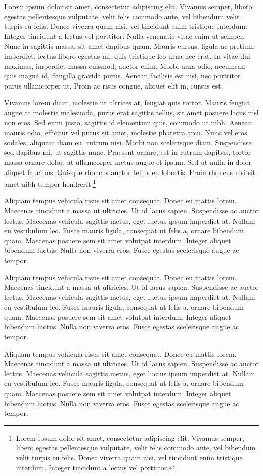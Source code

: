 
Lorem ipsum dolor sit amet, consectetur adipiscing elit. Vivamus semper, libero egestas pellentesque vulputate, velit felis commodo ante, vel bibendum velit turpis eu felis. Donec viverra quam nisi, vel tincidunt enim tristique interdum. Integer tincidunt a lectus vel porttitor. Nulla venenatis vitae enim ut semper. Nunc in sagittis massa, sit amet dapibus quam. Mauris cursus, ligula ac pretium imperdiet, lectus libero egestas mi, quis tristique leo urna nec erat. In vitae dui maximus, imperdiet massa euismod, auctor enim. Morbi urna odio, accumsan quis magna id, fringilla gravida purus. Aenean facilisis est nisi, nec porttitor purus ullamcorper ut. Proin ac risus congue, aliquet elit in, cursus est.

Vivamus lorem diam, molestie ut ultrices at, feugiat quis tortor. Mauris feugiat, augue at molestie malesuada, purus erat sagittis tellus, sit amet posuere lacus nisl non eros. Sed enim justo, sagittis id elementum quis, commodo ut nibh. Aenean mauris odio, efficitur vel purus sit amet, molestie pharetra arcu. Nunc vel eros sodales, aliquam diam eu, rutrum nisi. Morbi non scelerisque diam. Suspendisse sed dapibus mi, ut sagittis nunc. Praesent ornare, est in rutrum dapibus, tortor massa ornare dolor, at ullamcorper metus augue et ipsum. Sed ut nulla in dolor aliquet faucibus. Quisque rhoncus auctor tellus eu lobortis. Proin rhoncus nisi sit amet nibh tempor hendrerit.\footnote{Lorem ipsum dolor sit amet, consectetur adipiscing elit. Vivamus semper, libero egestas pellentesque vulputate, velit felis commodo ante, vel bibendum velit turpis eu felis. Donec viverra quam nisi, vel tincidunt enim tristique interdum. Integer tincidunt a lectus vel porttitor.}

Aliquam tempus vehicula risus sit amet consequat. Donec eu mattis lorem. Maecenas tincidunt a massa ut ultricies. Ut id lacus sapien. Suspendisse ac auctor lectus. Maecenas vehicula sagittis metus, eget luctus ipsum imperdiet at. Nullam eu vestibulum leo. Fusce mauris ligula, consequat ut felis a, ornare bibendum quam. Maecenas posuere sem sit amet volutpat interdum. Integer aliquet bibendum luctus. Nulla non viverra eros. Fusce egestas scelerisque augue ac tempor.


Aliquam tempus vehicula risus sit amet consequat. Donec eu mattis lorem. Maecenas tincidunt a massa ut ultricies. Ut id lacus sapien. Suspendisse ac auctor lectus. Maecenas vehicula sagittis metus, eget luctus ipsum imperdiet at. Nullam eu vestibulum leo. Fusce mauris ligula, consequat ut felis a, ornare bibendum quam. Maecenas posuere sem sit amet volutpat interdum. Integer aliquet bibendum luctus. Nulla non viverra eros. Fusce egestas scelerisque augue ac tempor.


Aliquam tempus vehicula risus sit amet consequat. Donec eu mattis lorem. Maecenas tincidunt a massa ut ultricies. Ut id lacus sapien. Suspendisse ac auctor lectus. Maecenas vehicula sagittis metus, eget luctus ipsum imperdiet at. Nullam eu vestibulum leo. Fusce mauris ligula, consequat ut felis a, ornare bibendum quam. Maecenas posuere sem sit amet volutpat interdum. Integer aliquet bibendum luctus. Nulla non viverra eros. Fusce egestas scelerisque augue ac tempor.